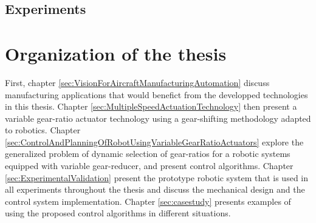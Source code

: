 \subsection{Experiments}




\section{Organization of the thesis}
\label{sec:OrganisationOfTheThesis}

First, chapter \ref{sec:VisionForAircraftManufacturingAutomation} discuss manufacturing applications that would benefict from the developped technologies in this thesis. Chapter \ref{sec:MultipleSpeedActuationTechnology} then present a variable gear-ratio actuator technology using a gear-shifting methodology adapted to robotics. Chapter \ref{sec:ControlAndPlanningOfRobotUsingVariableGearRatioActuators} explore the generalized problem of dynamic selection of gear-ratios for a robotic systems equipped with variable gear-reducer, and present control algorithms. Chapter \ref{sec:ExperimentalValidation} present the prototype robotic system that is used in all experiments throughout the thesis and discuss the mechanical design and the control system implementation. Chapter \ref{sec:casestudy} presents examples of using the proposed control algorithms in different situations.


